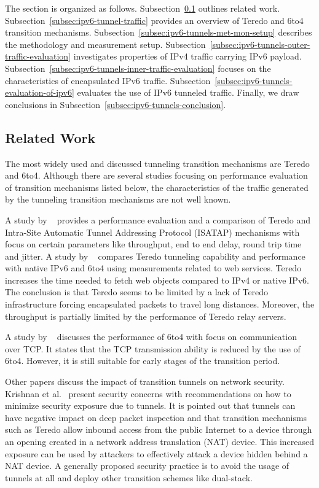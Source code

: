 The section is organized as follows. Subsection~\ref{subsec:ipv6-tunnels-related-work} outlines related work. Subsection~\ref{subsec:ipv6-tunnel-traffic} provides an overview of Teredo and 6to4 transition mechanisms. Subsection~\ref{subsec:ipv6-tunnels-met-mon-setup} describes the methodology and measurement setup. Subsection~\ref{subsec:ipv6-tunnels-outer-traffic-evaluation} investigates properties of IPv4 traffic carrying IPv6 payload. Subsection~\ref{subsec:ipv6-tunnels-inner-traffic-evaluation} focuses on the characteristics of encapsulated IPv6 traffic. Subsection~\ref{subsec:ipv6-tunnels-evaluation-of-ipv6} evaluates the use of IPv6 tunneled traffic. Finally, we draw conclusions in Subsection~\ref{subsec:ipv6-tunnels-conclusion}.

\subsection{Related Work} \label{subsec:ipv6-tunnels-related-work}

The most widely used and discussed tunneling transition mechanisms are Teredo and 6to4. Although there are several studies focusing on performance evaluation of transition mechanisms listed below, the characteristics of the traffic generated by the tunneling transition mechanisms are not well known.

A study by \citeauthor{Aazam-2010-Comparison}~\cite{Aazam-2010-Comparison} provides a performance evaluation and a comparison of Teredo and Intra-Site Automatic Tunnel Addressing Protocol (ISATAP) mechanisms with focus on certain parameters like throughput, end to end delay, round trip time and jitter. A study by \citeauthor{Zander-2012-Investigating}~\cite{Zander-2012-Investigating} compares Teredo tunneling capability and performance with native IPv6 and 6to4 using measurements related to web services. Teredo increases the time needed to fetch web objects compared to IPv4 or native IPv6. The conclusion is that Teredo seems to be limited by a lack of Teredo infrastructure forcing encapsulated packets to travel long distances. Moreover, the throughput is partially limited by the performance of Teredo relay servers.

A study by \citeauthor{Bahaman-2012-Network}~\cite{Bahaman-2012-Network} discusses the performance of 6to4 with focus on communication over TCP. It states that the TCP transmission ability is reduced by the use of 6to4. However, it is still suitable for early stages of the transition period.

Other papers discuss the impact of transition tunnels on network security. Krishnan et al.~\cite{rfc6169} present security concerns with recommendations on how to minimize security exposure due to tunnels. It is pointed out that tunnels can have negative impact on deep packet inspection and that transition mechanisms such as Teredo allow inbound access from the public Internet to a device through an opening created in a network address translation (NAT) device. This increased exposure can be used by attackers to effectively attack a device hidden behind a NAT device. A generally proposed security practice is to avoid the usage of tunnels at all and deploy other transition schemes like dual-stack.

